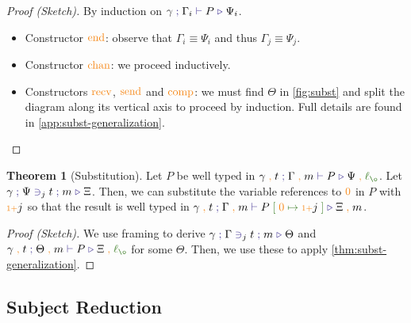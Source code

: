 \documentclass[a4paper,UKenglish,cleveref,autoref,thm-restate,authorcolumns]{lipics-v2019}
\theoremstyle{definition}
\newtheorem{nitheorem}{Theorem}
\newcommand{\type}[1]{\textcolor{BlueViolet}{\operatorname{#1}}}
\newcommand{\constr}[1]{\textcolor{BurntOrange}{\operatorname{#1}}}
\newcommand{\func}[1]{\textcolor{OliveGreen}{\operatorname{#1}}}
\newcommand{\suc}{\constr{\scriptstyle 1+}}
\newcommand{\comma}{\; \constr{,} \;}
\newcommand{\subst}[3]{#1 \; \func{[} \; #3 \; \func{\mapsto} \;#2 \; \func{]}}
\newcommand{\lz}{\func{\ell_{\o}}}
\newcommand{\types}[4]{#1 \; \type{;} \; #2 \; \type{\vdash} \; #3 \; \type{\triangleright} \; #4}
\newcommand{\contains}[6]{#1 \; \type{;} \; #2 \; \type{\ni}_{#3} \; #4 \; \type{;} \; #5 \; \type{\triangleright} \; #6}
\begin{document}
\begin{proof}[Proof (Sketch)]
  By induction on $\types{\gamma}{\Gamma_i}{P}{\Psi_i}$.
  \begin{itemize}
    \item
      Constructor $\constr{end}$: observe that $\Gamma_i \equiv \Psi_i$ and thus $\Gamma_j \equiv \Psi_j$.

    \item
      Constructor $\constr{chan}$: we proceed inductively.
      
    \item
      Constructors $\constr{recv}$, $\constr{send}$ and $\constr{comp}$: we must find $\Theta$ in \autoref{fig:subst} and split the diagram along its vertical axis to proceed by induction.
      Full details are found in \autoref{app:subst-generalization}. \qedhere
  \end{itemize}
\end{proof}

\begin{nitheorem}[Substitution]
  \label{thm:substitution}
  Let $P$ be well typed in $\types{\gamma \comma t}{\Gamma \comma m}{P}{\Psi \comma \lz}$.
  Let $\contains{\gamma}{\Psi}{j}{t}{m}{\Xi}$.
  Then, we can substitute the variable references to $\constr{0}$ in $P$ with $\suc j$ so that the result is well typed in $\types{\gamma \comma t}{\Gamma \comma m}{\subst{P}{\suc j}{\constr{0}}}{\Xi \comma m}$.
\end{nitheorem}
\begin{proof}[Proof (Sketch)]
  We use framing to derive $\contains{\gamma}{\Gamma}{j}{t}{m}{\Theta}$ and $\types{\gamma \comma t}{\Theta \comma m}{P}{\Xi \comma \lz}$ for some $\Theta$.
  Then, we use these to apply \autoref{thm:subst-generalization}.
\end{proof}

\subsection{Subject Reduction}
\label{subject-reduction}
\end{document}

